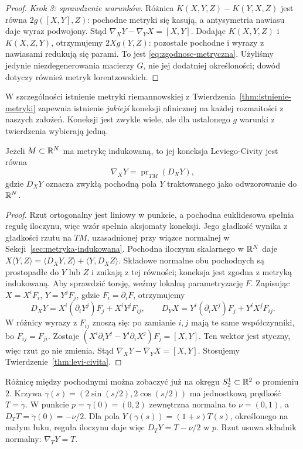 \begin{proof}
\emph{Krok 3: sprawdzenie warunków.}
Różnica $K(X,Y,Z)-K(Y,X,Z)$ jest równa
$2g([X,Y],Z)$: pochodne metryki
się kasują, a antysymetria nawiasu daje
wyraz podwojony. Stąd
$\nabla_XY-\nabla_YX=[X,Y]$.
Dodając $K(X,Y,Z)$ i $K(X,Z,Y)$,
otrzymujemy $2Xg(Y,Z)$: pozostałe pochodne
i wyrazy z nawiasami redukują się parami.
To jest \eqref{eq:zgodnosc-metryczna}.
Użyliśmy jedynie niezdegenerowania macierzy $G$,
nie jej dodatniej określoności; dowód dotyczy
również metryk lorentzowskich.
\end{proof}

W szczególności istnienie metryki riemannowskiej
z Twierdzenia~\ref{thm:istnienie-metryki}
zapewnia istnienie \emph{jakiejś} koneksji
afinicznej na każdej rozmaitości z naszych założeń.
Koneksji jest zwykle wiele, ale dla ustalonego $g$
warunki z twierdzenia wybierają jedną.

\begin{stwierdzenie}
\label{prop:koneksja-projekcja}
Jeżeli $M\subset\mathbb{R}^N$ ma metrykę indukowaną,
to jej koneksja Leviego-Civity jest równa
\[
 \nabla_XY=\operatorname{pr}_{TM}(D_XY),
\]
gdzie $D_XY$ oznacza zwykłą pochodną pola $Y$
traktowanego jako odwzorowanie do $\mathbb{R}^N$.
\end{stwierdzenie}
\begin{proof}
Rzut ortogonalny jest liniowy w punkcie,
a pochodna euklidesowa spełnia regułę iloczynu,
więc wzór spełnia aksjomaty koneksji.
Jego gładkość wynika z gładkości rzutu na $TM$,
uzasadnionej przy wiązce normalnej w
Sekcji~\ref{sec:metryka-indukowana}.
Pochodna iloczynu
skalarnego w $\mathbb{R}^N$ daje
$X\langle Y,Z\rangle
=\langle D_XY,Z\rangle+\langle Y,D_XZ\rangle$.
Składowe normalne obu pochodnych są prostopadłe
do $Y$ lub $Z$ i znikają z tej równości;
koneksja jest zgodna z metryką indukowaną.
Aby sprawdzić torsję, weźmy lokalną parametryzację $F$.
Zapisując $X=X^iF_i$, $Y=Y^jF_j$, gdzie
$F_i=\partial_iF$, otrzymujemy
\[
 D_XY=X^i(\partial_iY^j)F_j+X^iY^jF_{ij},
 \qquad
 D_YX=Y^i(\partial_iX^j)F_j+Y^iX^jF_{ij}.
\]
W różnicy wyrazy z $F_{ij}$ znoszą się:
po zamianie $i,j$ mają te same współczynniki,
bo $F_{ij}=F_{ji}$. Zostaje
$(X^i\partial_iY^j-Y^i\partial_iX^j)F_j=[X,Y]$.
Ten wektor jest styczny, więc rzut go nie zmienia.
Stąd $\nabla_XY-\nabla_YX=[X,Y]$.
Stosujemy Twierdzenie~\ref{thm:levi-civita}.
\end{proof}

Różnicę między pochodnymi można zobaczyć już na okręgu
$S_2^1\subset\mathbb{R}^2$ o promieniu $2$.
Krzywa $\gamma(s)=(2\sin(s/2),2\cos(s/2))$ ma jednostkową
prędkość $T=\dot\gamma$. W punkcie $p=\gamma(0)=(0,2)$
zewnętrzna normalna to $\nu=(0,1)$, a
$D_TT=\ddot\gamma(0)=-\nu/2$.
Dla pola $Y(\gamma(s))=(1+s)T(s)$, określonego na małym łuku,
reguła iloczynu daje więc $D_TY=T-\nu/2$ w $p$.
Rzut usuwa składnik normalny: $\nabla_TY=T$.

